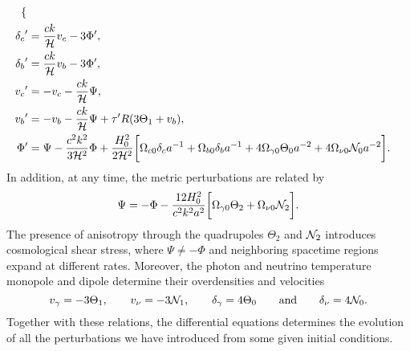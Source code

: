 \documentclass[10pt,a4paper]{article}
\begin{document}
\begin{subequations}
\begin{align}
\begin{dcases}
	                       \end{dcases} \\
	{\delta_c}^\prime   &= \frac{ck}{\mathcal{H}} v_c - 3 \Phi^\prime , \\
	{\delta_b}^\prime   &= \frac{ck}{\mathcal{H}} v_b - 3 \Phi^\prime , \\
	{v_c}^\prime        &= -v_c - \frac{ck}{\mathcal{H}} \Psi , \\
	{v_b}^\prime        &= -v_b - \frac{ck}{\mathcal{H}} \Psi + \tau^\prime R (3\Theta_1 + v_b), \\
	{\Phi}^\prime       &= \Psi - \frac{c^2 k^2}{3 \mathcal{H}^2} \Phi + \frac{H_0^2}{2 \mathcal{H}^2} \bigg[ \Omega_{c0} \delta_c a^{-1} + \Omega_{b0} \delta_b a^{-1} + 4 \Omega_{\gamma 0} \Theta_0 a^{-2} + 4 \Omega_{\nu 0} \mathcal{N}_0 a^{-2} \bigg] .
\end{align}
\label{eq_perturb_full}
\end{subequations}
In addition, at any time, the metric perturbations are related by
\begin{equation}
	\Psi  = -\Phi - \frac{12 H_0^2}{c^2 k^2 a^2} \bigg[ \Omega_{\gamma 0} \Theta_2 + \Omega_{\nu 0} \mathcal{N}_2 \bigg] .
\label{eq_potential_relation}
\end{equation}
The presence of anisotropy through the quadrupoles $\Theta_2$ and $\mathcal{N}_2$ introduces cosmological shear stress,
where $\Psi \neq -\Phi$ and neighboring spacetime regions expand at different rates.
Moreover, the photon and neutrino temperature monopole and dipole determine their overdensities and velocities
\begin{equation}
	v_\gamma = -3\Theta_1, \qquad
	v_\nu = -3\mathcal{N}_1, \qquad
	\delta_\gamma = 4\Theta_0 \qquad \text{and} \qquad
	\delta_\nu = 4\mathcal{N}_0.
\label{eq_radiation_velocity_overdensity}
\end{equation}
Together with these relations, the differential equations determines the evolution of all the perturbations we have introduced from some given initial conditions.
\end{document}
